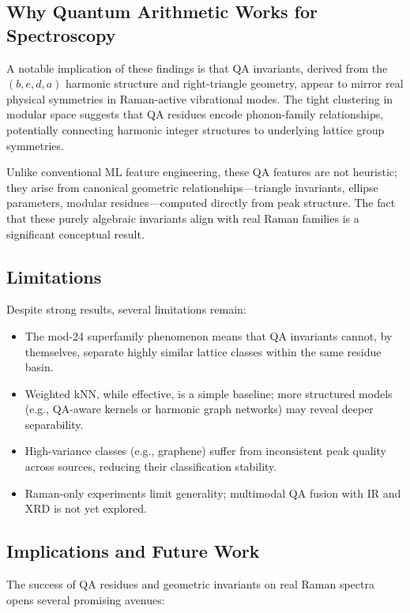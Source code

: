 \documentclass[12pt]{article}
\begin{document}
\subsection{Why Quantum Arithmetic Works for Spectroscopy}

A notable implication of these findings is that QA invariants, derived from the 
$(b,e,d,a)$ harmonic structure and right-triangle geometry, appear to mirror real physical symmetries 
in Raman-active vibrational modes.  
The tight clustering in modular space suggests that QA residues encode phonon-family relationships, 
potentially connecting harmonic integer structures to underlying lattice group symmetries.

Unlike conventional ML feature engineering, these QA features are not heuristic; they arise from 
canonical geometric relationships—triangle invariants, ellipse parameters, modular residues—computed 
directly from peak structure. The fact that these purely algebraic invariants align with real Raman 
families is a significant conceptual result.

\subsection{Limitations}

Despite strong results, several limitations remain:
\begin{itemize}
    \item The mod-24 superfamily phenomenon means that QA invariants cannot, by themselves, separate 
          highly similar lattice classes within the same residue basin.
    \item Weighted kNN, while effective, is a simple baseline; more structured models 
          (e.g., QA-aware kernels or harmonic graph networks) may reveal deeper separability.
    \item High-variance classes (e.g., graphene) suffer from inconsistent peak quality across sources,
          reducing their classification stability.
    \item Raman-only experiments limit generality; multimodal QA fusion with IR and XRD is not yet explored.
\end{itemize}

\subsection{Implications and Future Work}

The success of QA residues and geometric invariants on real Raman spectra opens several promising avenues:
\end{document}
